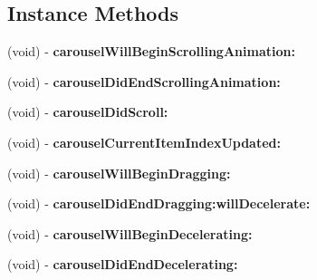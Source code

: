 \subsection*{Instance Methods}
\begin{DoxyCompactItemize}
\item 
\hypertarget{protocoli_carousel_delegate-p_a77482b064899576412c0b870e2837d61}{(void) -\/ {\bfseries carousel\-Will\-Begin\-Scrolling\-Animation\-:}}\label{protocoli_carousel_delegate-p_a77482b064899576412c0b870e2837d61}

\item 
\hypertarget{protocoli_carousel_delegate-p_ae41a6b044f53f31204c903c563b22185}{(void) -\/ {\bfseries carousel\-Did\-End\-Scrolling\-Animation\-:}}\label{protocoli_carousel_delegate-p_ae41a6b044f53f31204c903c563b22185}

\item 
\hypertarget{protocoli_carousel_delegate-p_a1bc038b3a00ccf7d5d494ef9cbb1d1ba}{(void) -\/ {\bfseries carousel\-Did\-Scroll\-:}}\label{protocoli_carousel_delegate-p_a1bc038b3a00ccf7d5d494ef9cbb1d1ba}

\item 
\hypertarget{protocoli_carousel_delegate-p_adef7ab53c4e60b1b85ee9df02298a4cd}{(void) -\/ {\bfseries carousel\-Current\-Item\-Index\-Updated\-:}}\label{protocoli_carousel_delegate-p_adef7ab53c4e60b1b85ee9df02298a4cd}

\item 
\hypertarget{protocoli_carousel_delegate-p_a03da7f39fdbf210078a15d4899f72d77}{(void) -\/ {\bfseries carousel\-Will\-Begin\-Dragging\-:}}\label{protocoli_carousel_delegate-p_a03da7f39fdbf210078a15d4899f72d77}

\item 
\hypertarget{protocoli_carousel_delegate-p_af67fdf56e690c20633212af86ed81870}{(void) -\/ {\bfseries carousel\-Did\-End\-Dragging\-:will\-Decelerate\-:}}\label{protocoli_carousel_delegate-p_af67fdf56e690c20633212af86ed81870}

\item 
\hypertarget{protocoli_carousel_delegate-p_ac6a99760afc29964ef016b78e1c69a19}{(void) -\/ {\bfseries carousel\-Will\-Begin\-Decelerating\-:}}\label{protocoli_carousel_delegate-p_ac6a99760afc29964ef016b78e1c69a19}

\item 
\hypertarget{protocoli_carousel_delegate-p_a1d7214558cb16653a7d7fe9bebec0127}{(void) -\/ {\bfseries carousel\-Did\-End\-Decelerating\-:}}\label{protocoli_carousel_delegate-p_a1d7214558cb16653a7d7fe9bebec0127}


\end{DoxyCompactItemize}
